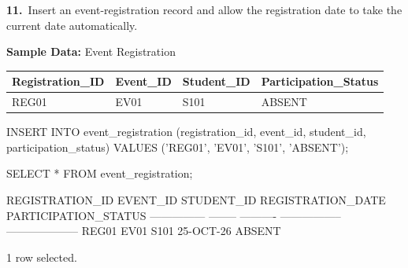 \noindent\begin{minipage}{\linewidth}
\begingroup{}
{\fontsize{14}{17}\selectfont\textbf{11.}}\ Insert an event-registration record and allow the registration date to take the current date automatically.\par
\endgroup\vspace{12pt}

\noindent\textbf{Sample Data:} Event Registration\par
\vspace{6pt}
{\small\setlength{\tabcolsep}{4pt}
\renewcommand{\arraystretch}{1.25}
\noindent\begin{tabular}{|>{\raggedright\arraybackslash}p{124.8pt}|>{\raggedright\arraybackslash}p{94.2pt}|>{\raggedright\arraybackslash}p{103.4pt}|>{\raggedright\arraybackslash}p{145.6pt}|}
\hline
\textbf{Registration\_ID} & \textbf{Event\_ID} & \textbf{Student\_ID} & \textbf{Participation\_Status} \\ \hline
REG01 & EV01 & S101 & ABSENT \\ \hline
\end{tabular}\par}
\vspace{14pt}

\begin{sqlcode}
INSERT INTO event_registration (registration_id, event_id, student_id,
                               participation_status)
VALUES ('REG01', 'EV01', 'S101', 'ABSENT');

SELECT * FROM event_registration;
\end{sqlcode}

\vspace{18pt}


\begin{sqlout}[fontsize=\small]
REGISTRATION_ID  EVENT_ID  STUDENT_ID  REGISTRATION_DATE  PARTICIPATION_STATUS
---------------  --------  ----------  -----------------  --------------------
REG01            EV01      S101        25-OCT-26          ABSENT

1 row selected.
\end{sqlout}
\end{minipage}\par\vspace{24pt}

